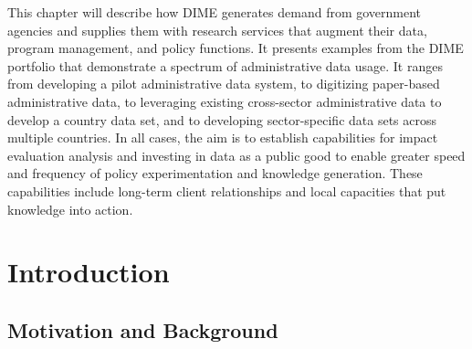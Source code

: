 This chapter will describe how DIME generates demand from government agencies and supplies them with research services that augment their data, program management, and policy functions. It presents examples from the DIME portfolio that demonstrate a spectrum of administrative data usage. It ranges from developing a pilot administrative data system, to digitizing paper-based administrative data, to leveraging existing cross-sector administrative data to develop a country data set, and to developing sector-specific data sets across multiple countries. In all cases, the aim is to establish capabilities for impact evaluation analysis and investing in data as a public good to enable greater speed and frequency of policy experimentation and knowledge generation. These capabilities include long-term client relationships and local capacities that put knowledge into action.

\hypertarget{introduction-8}{%
\section{Introduction}\label{introduction-8}}

\hypertarget{motivation-and-background-6}{%
\subsection{Motivation and Background}\label{motivation-and-background-6}}

